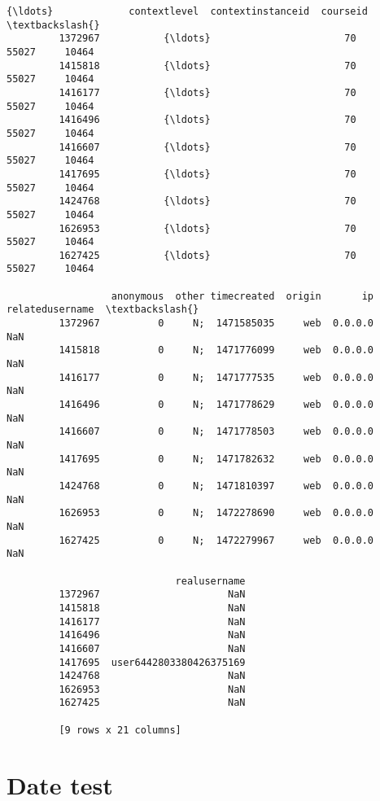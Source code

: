 \documentclass[11pt]{article}
\begin{document}
\begin{Verbatim}[commandchars=\\\{\}]
                           {\ldots}             contextlevel  contextinstanceid  courseid  \textbackslash{}
         1372967           {\ldots}                       70              55027     10464   
         1415818           {\ldots}                       70              55027     10464   
         1416177           {\ldots}                       70              55027     10464   
         1416496           {\ldots}                       70              55027     10464   
         1416607           {\ldots}                       70              55027     10464   
         1417695           {\ldots}                       70              55027     10464   
         1424768           {\ldots}                       70              55027     10464   
         1626953           {\ldots}                       70              55027     10464   
         1627425           {\ldots}                       70              55027     10464   
         
                  anonymous  other timecreated  origin       ip relatedusername  \textbackslash{}
         1372967          0     N;  1471585035     web  0.0.0.0             NaN   
         1415818          0     N;  1471776099     web  0.0.0.0             NaN   
         1416177          0     N;  1471777535     web  0.0.0.0             NaN   
         1416496          0     N;  1471778629     web  0.0.0.0             NaN   
         1416607          0     N;  1471778503     web  0.0.0.0             NaN   
         1417695          0     N;  1471782632     web  0.0.0.0             NaN   
         1424768          0     N;  1471810397     web  0.0.0.0             NaN   
         1626953          0     N;  1472278690     web  0.0.0.0             NaN   
         1627425          0     N;  1472279967     web  0.0.0.0             NaN   
         
                             realusername  
         1372967                      NaN  
         1415818                      NaN  
         1416177                      NaN  
         1416496                      NaN  
         1416607                      NaN  
         1417695  user6442803380426375169  
         1424768                      NaN  
         1626953                      NaN  
         1627425                      NaN  
         
         [9 rows x 21 columns]
\end{Verbatim}
            
    \section{Date test}\label{date-test}
\end{document}
